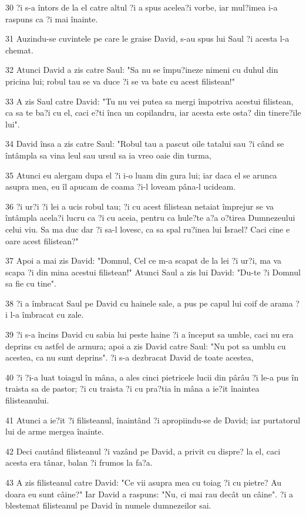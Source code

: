 \par 30 ?i s-a întors de la el catre altul ?i a spus acelea?i vorbe, iar mul?imea i-a raspuns ca ?i mai înainte.
\par 31 Auzindu-se cuvintele pe care le graise David, s-au spus lui Saul ?i acesta l-a chemat.
\par 32 Atunci David a zis catre Saul: "Sa nu se împu?ineze nimeni cu duhul din pricina lui; robul tau se va duce ?i se va bate cu acest filistean!"
\par 33 A zis Saul catre David: "Tu nu vei putea sa mergi împotriva acestui filistean, ca sa te ba?i cu el, caci e?ti înca un copilandru, iar acesta este osta? din tinere?ile lui".
\par 34 David însa a zis catre Saul: "Robul tau a pascut oile tatalui sau ?i când se întâmpla sa vina leul sau ursul sa ia vreo oaie din turma,
\par 35 Atunci eu alergam dupa el ?i i-o luam din gura lui; iar daca el se arunca asupra mea, eu îl apucam de coama ?i-l loveam pâna-l ucideam.
\par 36 ?i ur?i ?i lei a ucis robul tau; ?i cu acest filistean netaiat împrejur se va întâmpla acela?i lucru ca ?i cu aceia, pentru ca hule?te a?a o?tirea Dumnezeului celui viu. Sa ma duc dar ?i sa-l lovesc, ca sa spal ru?inea lui Israel? Caci cine e oare acest filistean?"
\par 37 Apoi a mai zis David: "Domnul, Cel ce m-a scapat de la lei ?i ur?i, ma va scapa ?i din mina acestui filistean!" Atunci Saul a zis lui David: "Du-te ?i Domnul sa fie cu tine".
\par 38 ?i a îmbracat Saul pe David cu hainele sale, a pus pe capul lui coif de arama ?i l-a îmbracat cu zale.
\par 39 ?i s-a încins David cu sabia lui peste haine ?i a început sa umble, caci nu era deprins cu astfel de armura; apoi a zis David catre Saul: "Nu pot sa umblu cu acestea, ca nu sunt deprins". ?i s-a dezbracat David de toate acestea,
\par 40 ?i ?i-a luat toiagul în mâna, a ales cinci pietricele lucii din pârâu ?i le-a pus în traista sa de pastor; ?i cu traista ?i cu pra?tia în mâna a ie?it înaintea filisteanului.
\par 41 Atunci a ie?it ?i filisteanul, înaintând ?i apropiindu-se de David; iar purtatorul lui de arme mergea înainte.
\par 42 Deci cautând filisteanul ?i vazând pe David, a privit cu dispre? la el, caci acesta era tânar, balan ?i frumos la fa?a.
\par 43 A zis filisteanul catre David: "Ce vii asupra mea cu toiag ?i cu pietre? Au doara eu sunt câine?" Iar David a raspuns: "Nu, ci mai rau decât un câine". ?i a blestemat filisteanul pe David în numele dumnezeilor sai.
